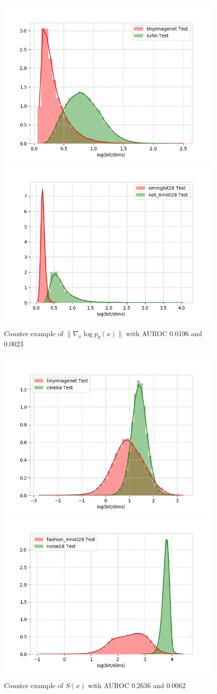 \documentclass[a3paper]{article}
\begin{document}
\begin{figure}[H]
\includegraphics[width=0.5\columnwidth]{figures/grad_norm_histogram}
\includegraphics[width=0.5\columnwidth]{figures/grad_norm_histogram-1}
\caption{Counter example of $\|\nabla_x \log p_\theta(x)\|$ with AUROC 0.0196 and 0.0023}
\end{figure}

\begin{figure}[H]
\includegraphics[width=0.5\columnwidth]{figures/ll_with_complexity_histogram}
\includegraphics[width=0.5\columnwidth]{figures/ll_with_complexity_histogram-1}
\caption{Counter example of $S(x)$ with AUROC 0.2636 and 0.0062}
\end{figure}
\end{document}
